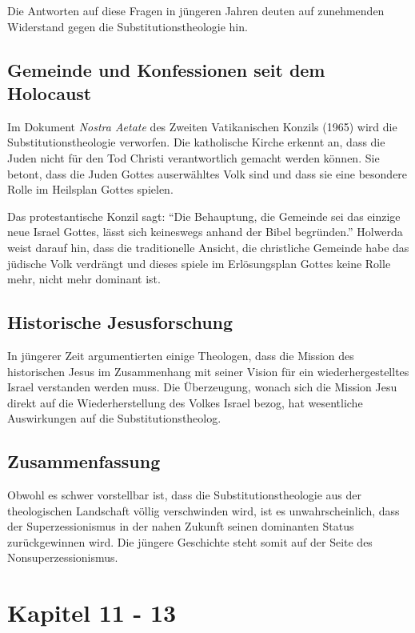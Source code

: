 \documentclass{../../inc/mybib}
\newcommand{\st}{Substitutionstheolog}
\newcommand{\sz}{Superzessionismus}
\begin{document}
    Die Antworten auf diese Fragen in jüngeren Jahren deuten auf zunehmenden Widerstand gegen die \st ie hin.

    \subsection{Gemeinde und Konfessionen seit dem Holocaust}
    Im Dokument \textit{Nostra Aetate} des Zweiten Vatikanischen Konzils (1965) wird die \st ie verworfen. Die katholische Kirche erkennt an, dass die Juden nicht für den Tod Christi verantwortlich gemacht werden können. Sie betont, dass die Juden Gottes auserwähltes Volk sind und dass sie eine besondere Rolle im Heilsplan Gottes spielen.

    Das protestantische Konzil sagt: \enquote{Die Behauptung, die Gemeinde sei das einzige neue Israel Gottes, lässt sich keineswegs anhand der Bibel begründen.} 
    Holwerda weist darauf hin, dass die traditionelle Ansicht, die christliche Gemeinde habe das jüdische Volk verdrängt und dieses spiele im Erlösungsplan Gottes keine Rolle mehr, nicht mehr dominant ist.

    \subsection{Historische Jesusforschung}
    In jüngerer Zeit argumentierten einige Theologen, dass die Mission des historischen Jesus im Zusammenhang mit seiner Vision für ein wiederhergestelltes Israel verstanden werden muss. Die Überzeugung, wonach sich die Mission Jesu direkt auf die Wiederherstellung des Volkes Israel bezog, hat wesentliche Auswirkungen auf die \st.

    \subsection{Zusammenfassung}
    Obwohl es schwer vorstellbar ist, dass die \st ie aus der theologischen Landschaft völlig verschwinden wird, ist es unwahrscheinlich, dass der \sz{} in der nahen Zukunft seinen dominanten Status zurückgewinnen wird. Die jüngere Geschichte steht somit auf der Seite des Nonsuperzessionismus.

    \section{Kapitel 11 - 13}
\end{document}
